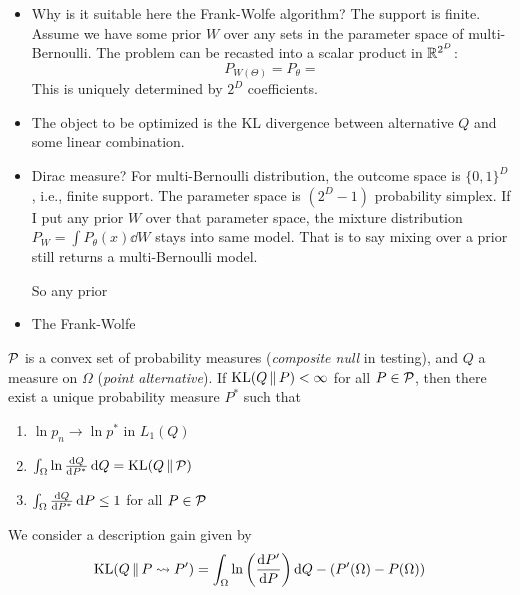 \begin{itemize}
	\item Why is it suitable here the Frank-Wolfe algorithm? The support is finite.
	Assume we have some prior $W$ over any sets in the parameter space of multi-Bernoulli.
	The problem can be recasted into a scalar product in $\mathbb{R}^{2^D}$:
	\begin{equation}
		P_{W(\Theta)} = P_{\theta} = 
	\end{equation}
	This is uniquely determined by $2^D$ coefficients.
	\item The object to be optimized is the KL divergence between alternative $Q$ 
	and some linear combination.
	\item Dirac measure?
	For multi-Bernoulli distribution, the outcome space is $\{0,1\}^D$, i.e., finite support.
	The parameter space is $(2^D-1)$ probability simplex.
	If I put any prior $W$ over that parameter space,
	the mixture distribution $P_W=\int P_{\theta}(x)\dd{W}$ stays into same model.
	That is to say mixing over a prior still returns a multi-Bernoulli model.
	
	So any prior 
	\item The Frank-Wolfe 
\end{itemize}


\begin{thm}[Li]
	$\mathcal{P}$ is a convex set of probability measures (\emph{composite null} in testing),
	and $Q$ a measure on $\Omega$ (\emph{point alternative}).
	If ${\mathrm{KL}}({Q} \,\Vert\, {P}) < \infty$ for all $P\in\mathcal{P}$,
	then there exist a unique probability measure $P^*$ such that
	\begin{enumerate}
		\item $\ln p_n \rightarrow \ln p^*$ in $L_1(Q)$ 
		\item $\int_{\Omega} \ln\dv{Q}{P^*}\dd{Q} = {\mathrm{KL}}({Q} \,\Vert\, {\mathcal{P}})$
		\item $\int_{\Omega} \dv{Q}{P^*}\dd{P}\leq 1$ for all $P\in\mathcal{P}$
	\end{enumerate}
\end{thm}

We consider a description gain given by
\begin{equation*}
	\KL{Q}{P \rightsquigarrow P'}=\int_{\Omega} \ln\left(\dv{P'}{P}\right) \dd{Q} - (P'(\Omega)-P(\Omega))
\end{equation*}

